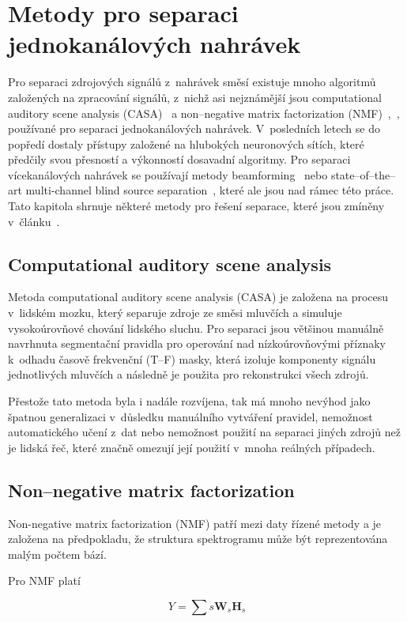 \section{Metody pro separaci jednokanálových nahrávek}
Pro separaci zdrojových signálů z~nahrávek směsí existuje mnoho algoritmů založených na zpracování signálů, z~nichž asi nejznámější jsou computational auditory scene analysis (CASA)~\cite{choi2005blind} a non--negative matrix factorization (NMF)~\cite{NIPS2000_1861},~\cite{yoshii2013beyond}, používané pro separaci jednokanálových nahrávek. V~posledních letech se do popředí dostaly přístupy založené na hlubokých neuronových sítích, které předčily svou přesností a výkonností dosavadní algoritmy. Pro separaci vícekanálových nahrávek se používají metody beamforming~\cite{adel2012beamforming} nebo state--of--the--art multi-channel blind source separation~\cite{Negro_2016}, které ale jsou nad rámec této práce. Tato kapitola shrnuje některé metody pro řešení separace, které jsou zmíněny v~článku~\cite{speechseparation}.


\subsection{Computational auditory scene analysis}
Metoda computational auditory scene analysis (CASA) je založena na procesu v~lidském mozku, který separuje zdroje ze směsi mluvčích a simuluje vysokoúrovňové chování lidského sluchu. Pro separaci jsou většinou manuálně navrhnuta segmentační pravidla pro operování nad nízkoúrovňovými příznaky k~odhadu časově frekvenční (T--F) masky, která izoluje komponenty signálu jednotlivých mluvčích a následně je použita pro rekonstrukci všech zdrojů.

Přestože tato metoda byla i nadále rozvíjena, tak má mnoho nevýhod jako špatnou generalizaci v~důsledku manuálního vytváření pravidel, nemožnost automatického učení z~dat nebo nemožnost použití na separaci jiných zdrojů než je lidská řeč, které značně omezují její použití v~mnoha reálných případech.


\subsection{Non--negative matrix factorization}
Non-negative matrix factorization (NMF) patří mezi daty řízené metody a je založena na předpokladu, že struktura spektrogramu může být reprezentována malým počtem bází.

Pro NMF platí

\begin{equation}
  Y = \sum{s}\textbf{W}_s\textbf{H}_s
\end{equation}

